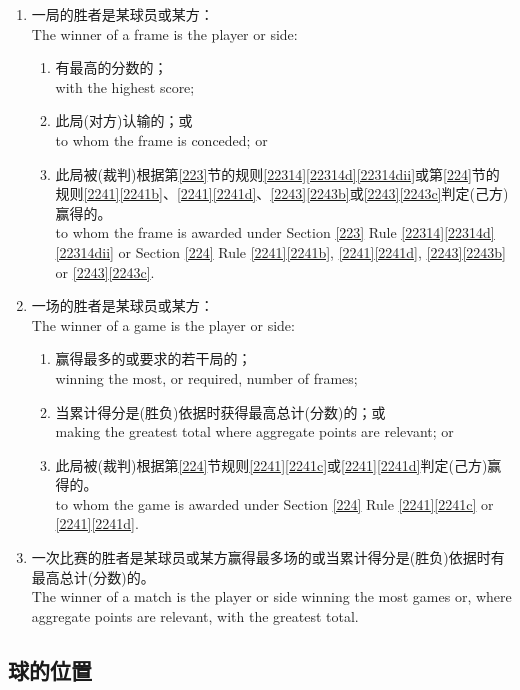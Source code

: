 \begin{enumerate}[label=(\alph*)]
    \item 一局的胜者是某球员或某方：\\
    The winner of a frame is the player or side:
    \begin{enumerate}[label=(\roman*)]
        \item 有最高的分数的；\\
        with the highest score;
        \item 此局(对方)认输的；或\\
        to whom the frame is conceded; or
        \item 此局被(裁判)根据第\ref{223}节的规则\ref{22314}\ref{22314d}\ref{22314dii}或第\ref{224}节的规则\ref{2241}\ref{2241b}、\ref{2241}\ref{2241d}、\ref{2243}\ref{2243b}或\ref{2243}\ref{2243c}判定(己方)赢得的。\\
        to whom the frame is awarded under Section \ref{223} Rule \ref{22314}\ref{22314d} \ref{22314dii} or Section \ref{224} Rule \ref{2241}\ref{2241b}, \ref{2241}\ref{2241d}, \ref{2243}\ref{2243b} or \ref{2243}\ref{2243c}.
    \end{enumerate}
    \item 一场的胜者是某球员或某方：\\
    The winner of a game is the player or side:
    \begin{enumerate}[label=(\roman*)]
        \item 赢得最多的或要求的若干局的；\\
        winning the most, or required, number of frames;
        \item 当累计得分是(胜负)依据时获得最高总计(分数)的；或\\
        making the greatest total where aggregate points are relevant; or
        \item 此局被(裁判)根据第\ref{224}节规则\ref{2241}\ref{2241c}或\ref{2241}\ref{2241d}判定(己方)赢得的。\\
        to whom the game is awarded under Section \ref{224} Rule \ref{2241}\ref{2241c} or \ref{2241}\ref{2241d}.
    \end{enumerate}
    \item \label{2231h}一次比赛的胜者是某球员或某方赢得最多场的或当累计得分是(胜负)依据时有最高总计(分数)的。\\
    The winner of a match is the player or side winning the most games or, where aggregate points are relevant, with the greatest total.
\end{enumerate}

\subsection{球的位置}\label{2232}

